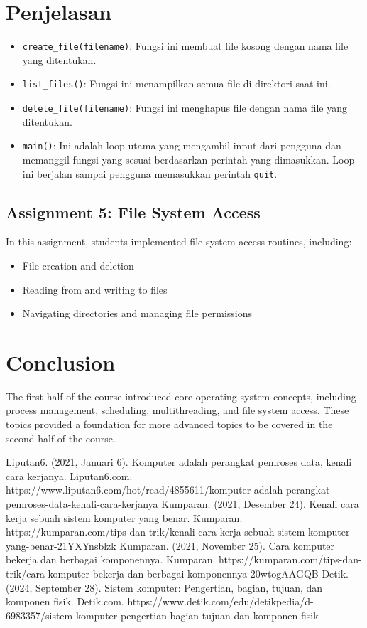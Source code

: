 \documentclass[12pt]{article}
\begin{document}
\section*{Penjelasan}
\begin{itemize}
    \item \texttt{create\_file(filename)}: Fungsi ini membuat file kosong dengan nama file yang ditentukan.
    \item \texttt{list\_files()}: Fungsi ini menampilkan semua file di direktori saat ini.
    \item \texttt{delete\_file(filename)}: Fungsi ini menghapus file dengan nama file yang ditentukan.
    \item \texttt{main()}: Ini adalah loop utama yang mengambil input dari pengguna dan memanggil fungsi yang sesuai berdasarkan perintah yang dimasukkan. Loop ini berjalan sampai pengguna memasukkan perintah \texttt{quit}.
\end{itemize}

\subsection{Assignment 5: File System Access}
In this assignment, students implemented file system access routines, including:
\begin{itemize}
    \item File creation and deletion
    \item Reading from and writing to files
    \item Navigating directories and managing file permissions
\end{itemize}

\section{Conclusion}
The first half of the course introduced core operating system concepts, including process management, scheduling, multithreading, and file system access. These topics provided a foundation for more advanced topics to be covered in the second half of the course.

\begin{thebibliography}
     Liputan6. (2021, Januari 6). Komputer adalah perangkat pemroses data, kenali cara kerjanya. Liputan6.com. https://www.liputan6.com/hot/read/4855611/komputer-adalah-perangkat-pemroses-data-kenali-cara-kerjanya
     Kumparan. (2021, Desember 24). Kenali cara kerja sebuah sistem komputer yang benar. Kumparan. https://kumparan.com/tips-dan-trik/kenali-cara-kerja-sebuah-sistem-komputer-yang-benar-21YXYnsblzk
     Kumparan. (2021, November 25). Cara komputer bekerja dan berbagai komponennya. Kumparan. https://kumparan.com/tips-dan-trik/cara-komputer-bekerja-dan-berbagai-komponennya-20wtogAAGQB
     Detik. (2024, September 28). Sistem komputer: Pengertian, bagian, tujuan, dan komponen fisik. Detik.com. https://www.detik.com/edu/detikpedia/d-6983357/sistem-komputer-pengertian-bagian-tujuan-dan-komponen-fisik
\end{thebibliography}
\end{document}
